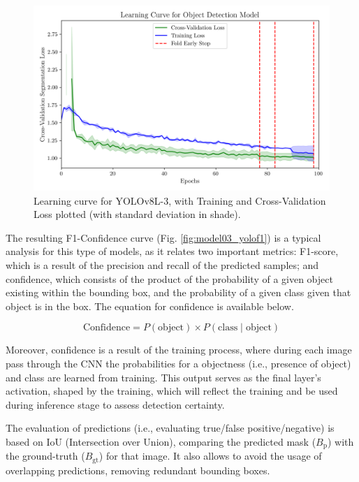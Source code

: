 \documentclass[conference]{IEEEtran}
\begin{document}
\begin{figure}[H]
    \centering
    \includegraphics[width=1\linewidth]{assets/model03_lc.png}
    \caption{Learning curve for YOLOv8L-3, with
Training and Cross-Validation Loss plotted (with standard
deviation in shade).}
    \label{fig:model03_lc}
\end{figure}

The resulting F1-Confidence curve (Fig. \ref{fig:model03_yolof1}) is a typical analysis for this type of models, as it relates two important metrics: F1-score, which is a result of the precision and recall of the predicted samples; and confidence, which consists of the product of the probability of a given object existing within the bounding box, and the probability of a given class given that object is in the box. The equation for confidence is available below.

\[
\text{Confidence} = P(\text{object}) \times P(\text{class} \mid \text{object})
\]

Moreover, confidence is a result of the training process, where during each image pass through the CNN the probabilities for a objectness (i.e., presence of object) and class are learned from training. This output serves as the final layer's activation, shaped by the training, which will reflect the training and be used during inference stage to assess detection certainty.

The evaluation of predictions (i.e., evaluating true/false positive/negative) is based on IoU (Intersection over Union), comparing the predicted mask ($B_{\text{p}}$) with the ground-truth ($B_{\text{gt}}$) for that image. It also allows to avoid the usage of overlapping predictions, removing redundant bounding boxes.
\end{document}
